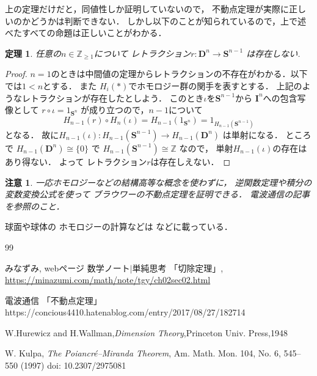 \documentclass[leqno, a4paper, 12pt]{jsarticle}
\newtheorem{thm}{定理}
\newtheorem*{rmk}{注意}
\newcommand{\zz}{\mathbb{Z}}
\newcommand{\mydisc}[1]{\mathbf{D}^{#1}}
\newcommand{\mysphere}[1]{\mathbf{S}^{#1}}
\newcommand{\mycube}[1]{\mathbf{I}^{n}}
\newcommand{\myhl}[2]{H_{#2}(#1)}
\begin{document}
上の定理だけだと，同値性しか証明していないので，
不動点定理が実際に正しいのかどうかは判断できない．
しかし以下のことが知られているので，上で述べたすべての命題は正しいことがわかる．
\begin{thm}
任意の$n\in \zz_{\ge 1}$について
レトラクション$r\colon \mydisc{n}\to \mysphere{n-1}$
は存在しない.
\end{thm}
\begin{proof}
$n=1$のときは中間値の定理からレトラクションの不存在がわかる．以下では$1<n$とする．
また
$\myhl{*}{i}$でホモロジー群の関手を表すとする．
上記のようなレトラクションが存在したとしよう．
このとき$\iota$を$\mysphere{n-1}$から
$\mycube{n}$への包含写像として
$r\circ  \iota = 1_{\mysphere{n}}$
が成り立つので，$n-1$について
\[
\myhl{r}{n-1}\circ \myhl{\iota}{n}=\myhl{1_{\mysphere{n}}}{n-1}=1_{\myhl{\mysphere{n-1}}{n-1}}
\]
となる．
故に$\myhl{\iota}{n-1}\colon \myhl{\mysphere{n-1}}{n-1}\to \myhl{\mydisc{n}}{n-1}$
は単射になる．
ところで
$\myhl{\mydisc{n}}{n-1}\cong \{0\}$
で
$\myhl{\mysphere{n-1}}{n-1}\cong\zz$
なので，
単射$\myhl{\iota}{n-1}$の存在はあり得ない．
よって
レトラクション$r$は存在しえない．
\end{proof}
\begin{rmk}
一応ホモロジーなどの結構高等な概念を使わずに，
逆関数定理や積分の変数変換公式を使って
ブラウワーの不動点定理を証明できる．
電波通信の記事\cite{dempa}を参照のこと．
\end{rmk}

球面や球体の
ホモロジーの計算などは
\cite{minazumi}などに載っている．



	
\begin{thebibliography}{99}

みなずみ, 
webページ
数学ノート$\mid$単純思考
「切除定理」, 
\url{https://minazumi.com/math/note/tgy/ch02sec02.html}

電波通信
「不動点定理」
https://concious4410.hatenablog.com/entry/2017/08/27/182714

W.Hurewicz and H.Wallman,\textit{Dimension Theory},Princeton Univ. Press,1948

W. Kulpa, 
\textit{The Poiancr\'{e}--Miranda Theorem}, 
Am. Math. Mon. 104, No. 6, 545--550 (1997)
doi: 10.2307/2975081
\end{thebibliography}




			
\end{document}
